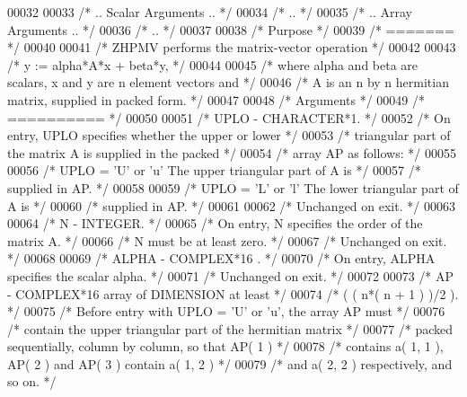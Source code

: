 \begin{DoxyCode}
00032 
00033 \textcolor{comment}{/*     .. Scalar Arguments .. */}
00034 \textcolor{comment}{/*     .. */}
00035 \textcolor{comment}{/*     .. Array Arguments .. */}
00036 \textcolor{comment}{/*     .. */}
00037 
00038 \textcolor{comment}{/*  Purpose */}
00039 \textcolor{comment}{/*  ======= */}
00040 
00041 \textcolor{comment}{/*  ZHPMV  performs the matrix-vector operation */}
00042 
00043 \textcolor{comment}{/*     y := alpha*A*x + beta*y, */}
00044 
00045 \textcolor{comment}{/*  where alpha and beta are scalars, x and y are n element vectors and */}
00046 \textcolor{comment}{/*  A is an n by n hermitian matrix, supplied in packed form. */}
00047 
00048 \textcolor{comment}{/*  Arguments */}
00049 \textcolor{comment}{/*  ========== */}
00050 
00051 \textcolor{comment}{/*  UPLO   - CHARACTER*1. */}
00052 \textcolor{comment}{/*           On entry, UPLO specifies whether the upper or lower */}
00053 \textcolor{comment}{/*           triangular part of the matrix A is supplied in the packed */}
00054 \textcolor{comment}{/*           array AP as follows: */}
00055 
00056 \textcolor{comment}{/*              UPLO = 'U' or 'u'   The upper triangular part of A is */}
00057 \textcolor{comment}{/*                                  supplied in AP. */}
00058 
00059 \textcolor{comment}{/*              UPLO = 'L' or 'l'   The lower triangular part of A is */}
00060 \textcolor{comment}{/*                                  supplied in AP. */}
00061 
00062 \textcolor{comment}{/*           Unchanged on exit. */}
00063 
00064 \textcolor{comment}{/*  N      - INTEGER. */}
00065 \textcolor{comment}{/*           On entry, N specifies the order of the matrix A. */}
00066 \textcolor{comment}{/*           N must be at least zero. */}
00067 \textcolor{comment}{/*           Unchanged on exit. */}
00068 
00069 \textcolor{comment}{/*  ALPHA  - COMPLEX*16      . */}
00070 \textcolor{comment}{/*           On entry, ALPHA specifies the scalar alpha. */}
00071 \textcolor{comment}{/*           Unchanged on exit. */}
00072 
00073 \textcolor{comment}{/*  AP     - COMPLEX*16       array of DIMENSION at least */}
00074 \textcolor{comment}{/*           ( ( n*( n + 1 ) )/2 ). */}
00075 \textcolor{comment}{/*           Before entry with UPLO = 'U' or 'u', the array AP must */}
00076 \textcolor{comment}{/*           contain the upper triangular part of the hermitian matrix */}
00077 \textcolor{comment}{/*           packed sequentially, column by column, so that AP( 1 ) */}
00078 \textcolor{comment}{/*           contains a( 1, 1 ), AP( 2 ) and AP( 3 ) contain a( 1, 2 ) */}
00079 \textcolor{comment}{/*           and a( 2, 2 ) respectively, and so on. */}

\end{DoxyCode}
